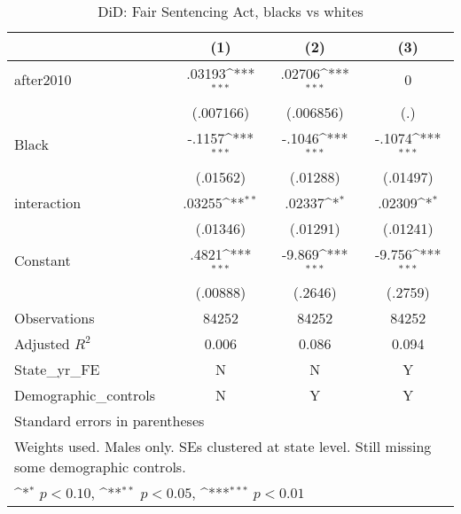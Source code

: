 \begin{table}[htbp]\centering
\def\sym#1{\ifmmode^{#1}\else\(^{#1}\)\fi}
\caption{DiD: Fair Sentencing Act, blacks vs whites}
\begin{tabular}{l*{3}{c}}
\hline\hline
                    &\multicolumn{1}{c}{(1)}         &\multicolumn{1}{c}{(2)}         &\multicolumn{1}{c}{(3)}         \\
\hline
after2010           &      .03193\sym{***}&      .02706\sym{***}&           0         \\
                    &   (.007166)         &   (.006856)         &         (.)         \\
[1em]
Black               &      -.1157\sym{***}&      -.1046\sym{***}&      -.1074\sym{***}\\
                    &    (.01562)         &    (.01288)         &    (.01497)         \\
[1em]
interaction         &      .03255\sym{**} &      .02337\sym{*}  &      .02309\sym{*}  \\
                    &    (.01346)         &    (.01291)         &    (.01241)         \\
[1em]
Constant            &       .4821\sym{***}&      -9.869\sym{***}&      -9.756\sym{***}\\
                    &    (.00888)         &     (.2646)         &     (.2759)         \\
\hline
Observations        &       84252         &       84252         &       84252         \\
Adjusted \(R^{2}\)  &       0.006         &       0.086         &       0.094         \\
State\_yr\_FE         &           N         &           N         &           Y         \\
Demographic\_controls&           N         &           Y         &           Y         \\
\hline\hline
\multicolumn{4}{l}{\footnotesize Standard errors in parentheses}\\
\multicolumn{4}{l}{\footnotesize Weights used. Males only. SEs clustered at state level. Still missing some demographic controls.}\\
\multicolumn{4}{l}{\footnotesize \sym{*} \(p<0.10\), \sym{**} \(p<0.05\), \sym{***} \(p<0.01\)}\\
\end{tabular}
\end{table}
